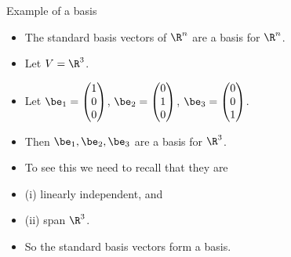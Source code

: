 \documentclass{beamer}
\begin{document}
\begin{frame}{Example of a basis}

\begin{itemize}
\item The standard basis vectors of $\R^n$ are a basis for $\R^n$.
\item Let $V = \R^3$.
\item Let $\be_1 =
\begin{pmatrix}
1 \\ 0 \\ 0
\end{pmatrix}
$,
$\be_2 =
\begin{pmatrix}
0 \\ 1 \\ 0
\end{pmatrix}
$,
$\be_3=
\begin{pmatrix}
0 \\ 0 \\ 1
\end{pmatrix}
$.

\item Then $\be_1,\be_2,\be_3$ are a basis for $\R^3$.
\item To see this we need to recall that they are
\item (i) linearly independent, and
\item (ii) span $\R^3$.
\item So the standard basis vectors form a basis.
\end{itemize}

\end{frame}
\end{document}
